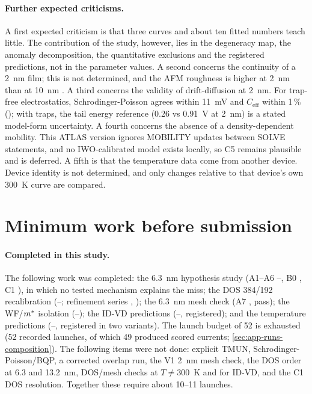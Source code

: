 \paragraph{Further expected criticisms.} A first expected criticism is that three curves and about ten fitted numbers teach little. The contribution of the study, however, lies in the degeneracy map, the anomaly decomposition, the quantitative exclusions and the registered predictions, not in the parameter values. A second concerns the continuity of a 2~nm film; this is not determined, and the AFM roughness is higher at 2~nm than at 10~nm \citep[p.~8]{Januar2026}. A third concerns the validity of drift-diffusion at 2~nm. For trap-free electrostatics, Schrodinger-Poisson agrees within 11~mV and $C_{\mathrm{eff}}$ within 1\,\% (\evSURR); with traps, the tail energy reference (0.26 vs 0.91~V at 2~nm) is a stated model-form uncertainty. A fourth concerns the absence of a density-dependent mobility. This ATLAS version ignores MOBILITY updates between SOLVE statements, and no IWO-calibrated model exists locally, so C5 remains plausible and is deferred. A fifth is that the temperature data come from another device. Device identity is not determined, and only changes relative to that device's own 300~K curve are compared.

\section{Minimum work before submission}\label{sec:val-checklist}

\paragraph{Completed in this study.} The following work was completed: the 6.3~nm hypothesis study (A1--A6 --, B0 , C1 ), in which no tested mechanism explains the miss; the DOS 384/192 recalibration (--; refinement series , ); the 6.3~nm mesh check (A7 , pass); the WF/$m^{*}$ isolation (--); the ID-VD predictions (--, registered); and the temperature predictions (--, registered in two variants). The launch budget of 52 is exhausted (52 recorded launches, of which 49 produced scored currents; \cref{sec:app-runs-composition}). The following items were not done: explicit TMUN, Schrodinger-Poisson/BQP, a corrected overlap run, the V1 2~nm mesh check, the DOS order at 6.3 and 13.2~nm, DOS/mesh checks at $T\neq300$~K and for ID-VD, and the C1 DOS resolution. Together these require about 10--11 launches.

